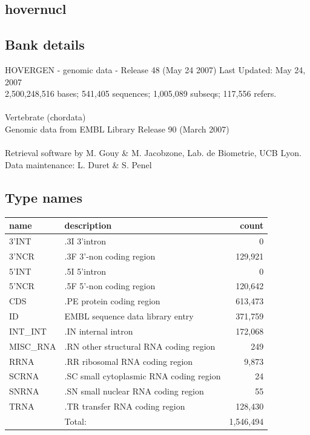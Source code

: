 \documentclass{article}
\begin{document}
\begin{Schunk}
\section{ hovernucl }
\subsection{Bank details}
HOVERGEN - genomic data - Release 48 (May 24 2007) Last Updated: May 24, 2007\\
2,500,248,516 bases; 541,405 sequences; 1,005,089 subseqs; 117,556 refers.\\
\\
Vertebrate (chordata)\\
Genomic data from EMBL Library Release 90 (March 2007)\\
\\
Retrieval software by M. Gouy \& M. Jacobzone, Lab. de Biometrie, UCB Lyon.\\
Data maintenance: L. Duret \& S. Penel\\


\subsection{Type names}
\noindent\begin{tabular}{llr}
\hline \hline
name & description & count \\
\hline
3'INT  &  .3I 3'intron  &  0 \\
3'NCR  &  .3F  3'-non coding region  &  129,921 \\
5'INT  &  .5I 5'intron  &  0 \\
5'NCR  &  .5F  5'-non coding region  &  120,642 \\
CDS  &  .PE protein coding region  &  613,473 \\
ID  &  EMBL sequence data library entry  &  371,759 \\
INT\_INT  &  .IN  internal intron  &  172,068 \\
MISC\_RNA  &  .RN other structural RNA coding region  &  249 \\
RRNA  &  .RR ribosomal RNA coding region  &  9,873 \\
SCRNA  &  .SC small cytoplasmic RNA coding region  &  24 \\
SNRNA  &  .SN small nuclear RNA coding region  &  55 \\
TRNA  &  .TR transfer RNA coding region  &  128,430 \\
\hline
 & Total: & 1,546,494 \\
\hline \hline
\end{tabular}


\end{Schunk}
\end{document}
